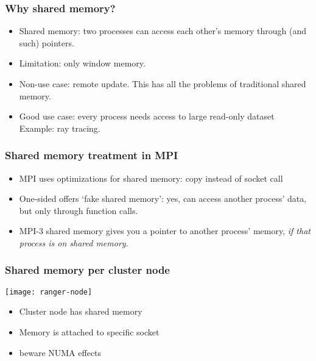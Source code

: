 
\begin{frame}[containsverbatim]\frametitle{Why shared memory?}
  \begin{itemize}
  \item Shared memory: two processes can access each other's
    memory through  (and such) pointers.
  \item Limitation: only window memory.
  \item Non-use case: remote update. This has all the problems of
    traditional shared memory.
  \item Good use case: every process needs access to large read-only
    dataset\\ Example: ray tracing.
  \end{itemize}
\end{frame}

\begin{frame}[containsverbatim]\frametitle{Shared memory treatment in MPI}
  \begin{itemize}
  \item MPI uses optimizations for shared memory: copy instead of
    socket call
  \item One-sided offers `fake shared memory': yes, can access another
    process' data, but only through function calls.
  \item MPI-3 shared memory gives you a pointer to another process'
    memory, \emph{if that process is on shared memory}.
  \end{itemize}
\end{frame}

\begin{frame}[containsverbatim]\frametitle{Shared memory per cluster node}
\texttt{[image: ranger-node]}
\begin{itemize}
\item Cluster node has shared memory
\item Memory is attached to specific socket
\item beware \ac{NUMA} effects
\end{itemize}
\end{frame}

